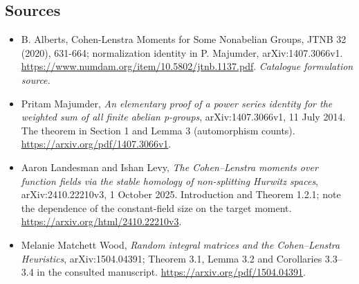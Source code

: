 \documentclass[11pt,a4paper]{article}
\numberwithin{equation}{section}
\begin{document}
\subsection{Sources}
\begin{itemize}\raggedright
\item[\textnormal{[S1]}]\hypertarget{source:30006735:1}{} B. Alberts, Cohen-Lenstra Moments for Some Nonabelian Groups, JTNB 32 (2020), 631-664; normalization identity in P. Majumder, arXiv:1407.3066v1.
\url{https://www.numdam.org/item/10.5802/jtnb.1137.pdf}.
{\small\textit{Catalogue formulation source.}}
\item[\textnormal{[E1]}]\hypertarget{extra:30006735:1}{} Pritam Majumder,
\emph{An elementary proof of a power series identity for the weighted sum
of all finite abelian p-groups}, arXiv:1407.3066v1, 11 July 2014.
The theorem in Section 1 and Lemma 3 (automorphism counts).
\url{https://arxiv.org/pdf/1407.3066v1}.
\item[\textnormal{[E2]}]\hypertarget{extra:30006735:2}{} Aaron Landesman and Ishan Levy,
\emph{The Cohen--Lenstra moments over function fields via the stable
homology of non-splitting Hurwitz spaces}, arXiv:2410.22210v3,
1 October 2025. Introduction and Theorem 1.2.1; note the dependence of
the constant-field size on the target moment.
\url{https://arxiv.org/html/2410.22210v3}.
\item[\textnormal{[E3]}]\hypertarget{extra:30006735:3}{} Melanie Matchett Wood,
\emph{Random integral matrices and the Cohen--Lenstra Heuristics},
arXiv:1504.04391; Theorem 3.1, Lemma 3.2 and Corollaries 3.3--3.4
in the consulted manuscript.
\url{https://arxiv.org/pdf/1504.04391}.
\end{itemize}
\end{document}
